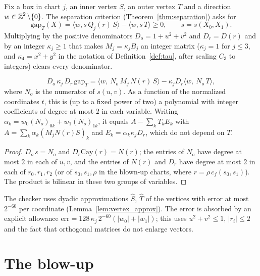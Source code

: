 Fix a box in chart $j$, an inner vertex $S$, an outer vertex $T$ and a direction
$w \in \operatorname{\mathbb{Z}}^2 \setminus \{0\}$. The separation criterion
(Theorem~\ref{thm:separation}) asks for
\[
  \mathrm{gap}_T(X) = \langle w, s\, Q_j(r)\, S \rangle - \langle w, s\, T \rangle \ge 0,
  \qquad s = s(X_0, X_1).
\]
Multiplying by the positive denominators $D_o = 1 + u^2 + v^2$ and $D_r = D(r)$ and by an
integer $\kappa_j \ge 1$ that makes $M_j = \kappa_j B_j$ an integer matrix
($\kappa_j = 1$ for $j \le 3$, and $\kappa_4 = x^2 + y^2$ in the notation of
Definition~\ref{def:tau}, after scaling $C_3$ to integers) clears every denominator.

\begin{lemma}
\label{lem:gap_poly}
\leanok
{}
\[
  D_o\,\kappa_j\,D_r\,\mathrm{gap}_T
  = \bigl\langle w,\ N_o\, M_j\, N(r)\, S \bigr\rangle - \kappa_j D_r \bigl\langle w,\ N_o\, T \bigr\rangle,
\]
where $N_o$ is the numerator of $s(u, v)$. As a function of the normalized coordinates
$t$, this is (up to a fixed power of two) a polynomial with integer coefficients of
degree at most $2$ in each variable. Writing $\alpha_k = w_0 (N_o)_{0k} + w_1 (N_o)_{1k}$,
it equals $A - \sum_k T_k E_k$ with $A = \sum_k \alpha_k (M_j N(r) S)_k$ and
$E_k = \alpha_k \kappa_j D_r$, which do not depend on $T$.
\end{lemma}
\begin{proof}
\leanok
$D_o\, s = N_o$ and $D_r \mathrm{Cay}(r) = N(r)$; the entries of $N_o$ have degree at most
$2$ in each of $u, v$, and the entries of $N(r)$ and $D_r$ have degree at most $2$ in each
of $r_0, r_1, r_2$ (or of $s_0, s_1, \rho$ in the blown-up charts, where
$r = \rho\, c_f(s_0, s_1)$). The product is bilinear in these two groups of variables.
\end{proof}

The checker uses dyadic approximations $\hat S$, $\hat T$ of the vertices with error
at most $2^{-60}$ per coordinate (Lemma~\ref{lem:vertex_approx}). The error is absorbed
by an explicit allowance $\mathrm{err} = 128\, \kappa_j\, 2^{-60} (|w_0| + |w_1|)$; this
uses $u^2 + v^2 \le 1$, $|r_i| \le 2$ and the fact that orthogonal matrices do not enlarge
vectors.

\section{The blow-up}
\label{sec:blowup}

